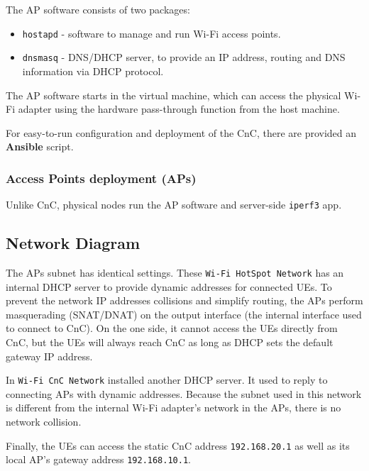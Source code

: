 The AP software consists of two packages:

\begin{itemize}
\tightlist
\item
  \texttt{hostapd} - software to manage and run Wi-Fi access points.
\item
  \texttt{dnsmasq} - DNS/DHCP server, to provide an IP address, routing
  and DNS information via DHCP protocol.
\end{itemize}

The AP software starts in the virtual machine, which can access the physical Wi-Fi adapter using the hardware pass-through function from the host machine.

For easy-to-run configuration and deployment of the CnC, there are
provided an \textbf{Ansible} script.

\hypertarget{access-points-deployment-aps}{%
\subsubsection{Access Points deployment
(APs)}\label{access-points-deployment-aps}}

Unlike CnC, physical nodes run the AP software and server-side
\texttt{iperf3} app.

\hypertarget{network-diagram}{%
\subsection{Network Diagram}\label{network-diagram}}

The APs subnet has identical settings. These
\texttt{Wi-Fi\ HotSpot\ Network} has an internal DHCP server to provide
dynamic addresses for connected UEs. To prevent the network IP addresses
collisions and simplify routing, the APs perform masquerading
(SNAT/DNAT) on the output interface (the internal interface used to
connect to CnC). On the one side, it cannot access the UEs directly from
CnC, but the UEs will always reach CnC as long as DHCP sets the default
gateway IP address.

In \texttt{Wi-Fi\ CnC\ Network} installed another DHCP server. It used
to reply to connecting APs with dynamic addresses. Because the subnet
used in this network is different from the internal Wi-Fi adapter's
network in the APs, there is no network collision.

Finally, the UEs can access the static CnC address \texttt{192.168.20.1}
as well as its local AP's gateway address \texttt{192.168.10.1}.


